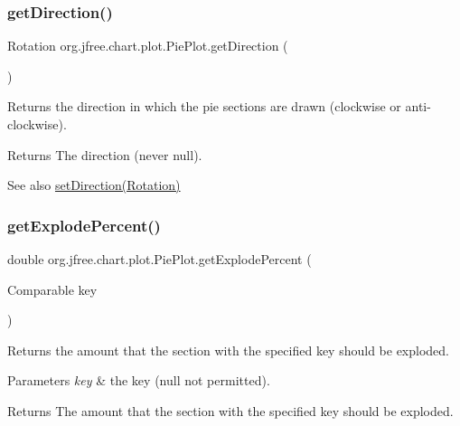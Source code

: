 \subsubsection{\texorpdfstring{get\+Direction()}{getDirection()}}
{\footnotesize\ttfamily Rotation org.\+jfree.\+chart.\+plot.\+Pie\+Plot.\+get\+Direction (\begin{DoxyParamCaption}{ }\end{DoxyParamCaption})}

Returns the direction in which the pie sections are drawn (clockwise or anti-\/clockwise).

\begin{DoxyReturn}{Returns}
The direction (never {\ttfamily null}).
\end{DoxyReturn}
\begin{DoxySeeAlso}{See also}
\mbox{\hyperlink{classorg_1_1jfree_1_1chart_1_1plot_1_1_pie_plot_a771df380edf05a0b83596b7b82002856}{set\+Direction(\+Rotation)}} 
\end{DoxySeeAlso}
\mbox{\label{classorg_1_1jfree_1_1chart_1_1plot_1_1_pie_plot_ab824066f262be4fe291d104aec9be9e7}} 
\subsubsection{\texorpdfstring{get\+Explode\+Percent()}{getExplodePercent()}\hspace{0.1cm}{\footnotesize\ttfamily [1/2]}}
{\footnotesize\ttfamily double org.\+jfree.\+chart.\+plot.\+Pie\+Plot.\+get\+Explode\+Percent (\begin{DoxyParamCaption}\item[{Comparable}]{key }\end{DoxyParamCaption})}

Returns the amount that the section with the specified key should be exploded.


\begin{DoxyParams}{Parameters}
{\em key} & the key ({\ttfamily null} not permitted).\\
\hline
\end{DoxyParams}
\begin{DoxyReturn}{Returns}
The amount that the section with the specified key should be exploded.
\end{DoxyReturn}

